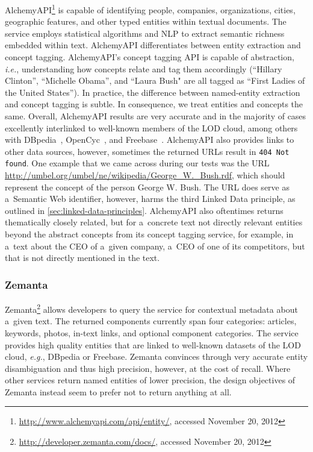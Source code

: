 AlchemyAPI\footnote{\url{http://www.alchemyapi.com/api/entity/},
accessed November 20, 2012}
is capable of identifying people, companies, organizations,
cities, geographic features, and other typed entities within
textual documents.
The service employs statistical algorithms and NLP
to extract semantic richness embedded within text.
AlchemyAPI differentiates between entity extraction and
concept tagging.
AlchemyAPI's concept tagging API is capable of abstraction, \emph{i.e.},
understanding how concepts relate and tag them accordingly
(``Hillary Clinton'', ``Michelle Obama'', and ``Laura Bush" are all
tagged as ``First Ladies of the United States'').
In practice, the difference between named-entity extraction
and concept tagging is subtle.
In consequence, we treat entities and concepts the same.
Overall, AlchemyAPI results are very accurate
and in the majority of cases excellently interlinked
to well-known members of the LOD cloud,
among others with DBpedia~\cite{auer2007dbpedia},
OpenCyc~\cite{lenat1995cyc},
and Freebase~\cite{markoff2007freebase}.
AlchemyAPI also provides links to other data sources, however,
sometimes the returned URLs result in \texttt{404 Not found}.
One example that we came across during our tests was the URL
\url{http://umbel.org/umbel/ne/wikipedia/George\_W.\_Bush.rdf}, which should represent the concept of the person George W. Bush.
The URL does serve as a~Semantic Web identifier, however, 
harms the third Linked Data principle,
as outlined in \autoref{sec:linked-data-principles}.
AlchemyAPI also oftentimes returns thematically closely related,
but for a~concrete text not directly relevant entities
beyond the abstract concepts from its concept tagging service,
for example, in a~text about the CEO of a~given company, a~CEO of one of its competitors, but that is not directly mentioned in the text.

\subsubsection{Zemanta}

Zemanta\footnote{\url{http://developer.zemanta.com/docs/},
accessed November 20, 2012}
allows developers to query the service for contextual metadata
about a~given text.
The returned components currently span four categories:
articles, keywords, photos, in-text links, and
optional component categories.
The service provides high quality entities that are linked
to well-known datasets of the LOD cloud, \emph{e.g.},
DBpedia or Freebase.
Zemanta convinces through very accurate entity disambiguation
and thus high precision, however, at the cost of recall.
Where other services return named entities of lower precision,
the design objectives of Zemanta instead seem to prefer
not to return anything at all.

